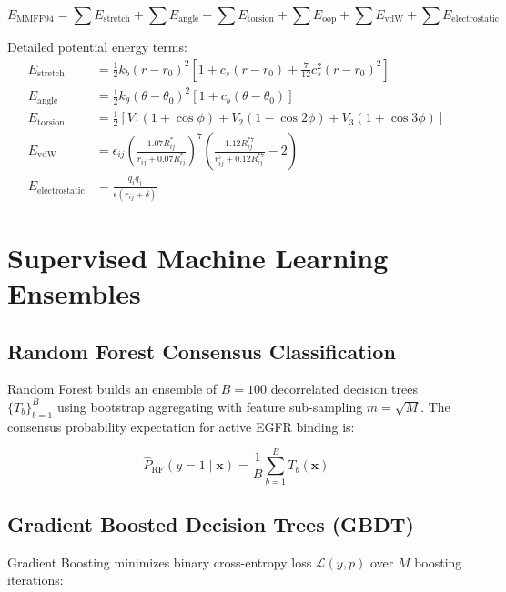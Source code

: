 \documentclass[11pt,a4paper]{article}
\begin{document}
\begin{equation}
\label{eq:mmff94}
E_{\text{MMFF94}} = \sum E_{\text{stretch}} + \sum E_{\text{angle}} + \sum E_{\text{torsion}} + \sum E_{\text{oop}} + \sum E_{\text{vdW}} + \sum E_{\text{electrostatic}}
\end{equation}

\noindent Detailed potential energy terms:
\begin{align}
E_{\text{stretch}} &= \frac{1}{2} k_b (r - r_0)^2 \left[ 1 + c_s (r - r_0) + \frac{7}{12} c_s^2 (r - r_0)^2 \right] \\
E_{\text{angle}} &= \frac{1}{2} k_\theta (\theta - \theta_0)^2 \left[ 1 + c_b (\theta - \theta_0) \right] \\
E_{\text{torsion}} &= \frac{1}{2} \left[ V_1 (1 + \cos\phi) + V_2 (1 - \cos 2\phi) + V_3 (1 + \cos 3\phi) \right] \\
E_{\text{vdW}} &= \epsilon_{ij} \left( \frac{1.07 R_{ij}^*}{r_{ij} + 0.07 R_{ij}^*} \right)^7 \left( \frac{1.12 R_{ij}^{*7}}{r_{ij}^7 + 0.12 R_{ij}^{*7}} - 2 \right) \\
E_{\text{electrostatic}} &= \frac{q_i q_j}{\epsilon (r_{ij} + \delta)}
\end{align}

\section{Supervised Machine Learning Ensembles}

\subsection{Random Forest Consensus Classification}
Random Forest builds an ensemble of $B = 100$ decorrelated decision trees $\{T_b\}_{b=1}^B$ using bootstrap aggregating with feature sub-sampling $m = \sqrt{M}$. The consensus probability expectation for active EGFR binding is:

\begin{equation}
\label{eq:rf_prob}
\hat{P}_{\text{RF}}(y = 1 \mid \mathbf{x}) = \frac{1}{B} \sum_{b=1}^{B} T_b(\mathbf{x})
\end{equation}

\subsection{Gradient Boosted Decision Trees (GBDT)}
Gradient Boosting minimizes binary cross-entropy loss $\mathcal{L}(y, p)$ over $M$ boosting iterations:
\end{document}
